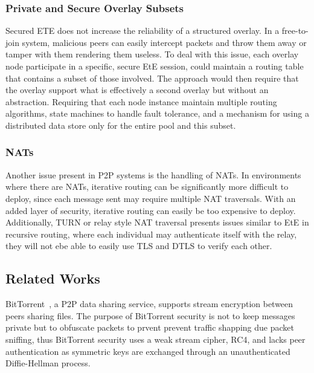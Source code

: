 \documentclass[conference]{IEEEtran}
\begin{document}
\subsubsection{Private and Secure Overlay Subsets}
Secured ETE does not increase the reliability of a structured
overlay.  In a free-to-join system, malicious peers can easily intercept packets
and throw them away or tamper with them rendering them useless.  To deal with
this issue, each overlay node participate in a specific, secure EtE session,
could maintain a routing table that contains a subset of those involved.  The
approach would then require that the overlay support what is effectively a
second overlay but without an abstraction.  Requiring that each node instance
maintain multiple routing algorithms, state machines to handle fault tolerance,
and a mechanism for using a distributed data store only for the entire pool and
this subset.

\subsubsection{NATs}
Another issue present in P2P systems is the handling of NATs.  In environments
where there are NATs, iterative routing can be significantly more difficult to
deploy, since each message sent may require multiple NAT traversals.  With an
added layer of security, iterative routing can easily be too expensive to
deploy.   Additionally, TURN or relay style NAT traversal presents issues
similar to EtE in recursive routing, where each individual may authenticate
itself with the relay, they will not ebe able to easily use TLS and DTLS to
verify each other.

\subsection{Related Works}
BitTorrent~\cite{bittorrent_security}, a P2P data sharing service,  supports
stream encryption between peers sharing files.  The purpose of BitTorrent
security is not to keep messages private but to obfuscate packets to prvent
prevent traffic shapping due packet sniffing, thus BitTorrent security uses a
weak stream cipher, RC4, and lacks peer authentication as symmetric keys are
exchanged through an unauthenticated Diffie-Hellman process.
\end{document}
